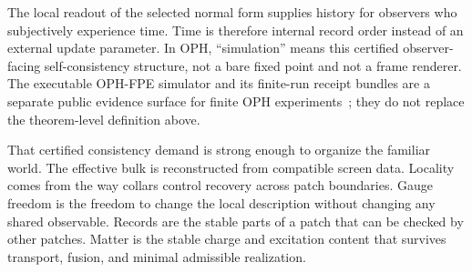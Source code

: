 \documentclass[11pt]{article}
\begin{document}
The local readout of the selected normal form supplies history for observers who subjectively
experience time. Time is therefore internal record order instead of an external update
parameter. In OPH, ``simulation'' means this certified observer-facing self-consistency
structure, not a bare fixed point and not a frame renderer. The executable OPH-FPE simulator
and its finite-run receipt bundles are a separate public evidence surface for finite OPH
experiments~\cite{ophfpe}; they do not replace the theorem-level definition above.

That certified consistency demand is strong enough to organize the familiar world. The effective bulk is reconstructed
from compatible screen data. Locality comes from the way collars control recovery across patch
boundaries. Gauge freedom is the freedom to change the local description without changing any shared
observable. Records are the stable parts of a patch that can be checked by other patches. Matter is
the stable charge and excitation content that survives transport, fusion, and minimal admissible
realization.
\end{document}
